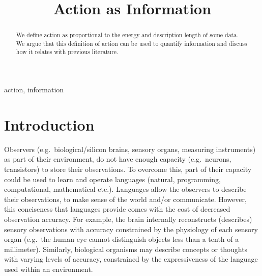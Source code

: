 \documentclass[twoside,11pt]{article}
\begin{document}
\title{Action as Information}
\author{  }


\maketitle

\begin{abstract}
	We define action as proportional to the energy and description length of some data.
	We argue that this definition of action can be used to quantify information and discuss how it relates with previous literature.
\end{abstract}

\begin{keywords}
	action, information
\end{keywords}

\section{Introduction}
Observers (e.g.\ biological/silicon brains, sensory organs, measuring instruments) as part of their environment, do not have enough capacity (e.g.\ neurons, transistors) to store their observations.
To overcome this, part of their capacity could be used to learn and operate languages (natural, programming, computational, mathematical etc.).
Languages allow the observers to describe their observations, to make sense of the world and/or communicate.
However, this conciseness that languages provide comes with the cost of decreased observation accuracy.
For example, the brain internally reconstructs (describes) sensory observations with accuracy constrained by the physiology of each sensory organ (e.g.\ the human eye cannot distinguish objects less than a tenth of a millimeter).
Similarly, biological organisms may describe concepts or thoughts with varying levels of accuracy, constrained by the expressiveness of the language used within an environment.
\end{document}

